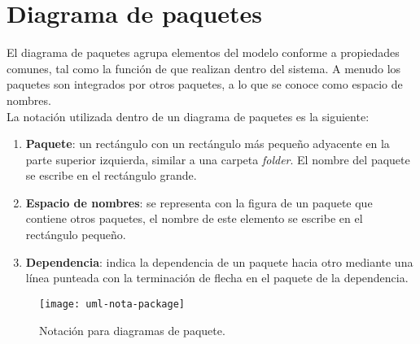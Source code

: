\section{Diagrama de paquetes}\label{sec:uml-package}
El diagrama de paquetes agrupa elementos del modelo conforme a propiedades comunes, tal como la función de que realizan dentro del sistema. A menudo los paquetes son integrados por otros paquetes, a lo que se conoce como espacio de nombres\cite{UMLClassroom}.\\
La notación utilizada dentro de un diagrama de paquetes es la siguiente\cite{UMLClassroom, SoftwareEngineeringUML}:
\begin{enumerate}
   \item \textbf{Paquete}: un rectángulo con un rectángulo más pequeño adyacente en la parte superior izquierda, similar a una carpeta \textit{folder}. El nombre del paquete se escribe en el rectángulo grande.
   \item \textbf{Espacio de nombres}: se representa con la figura de un paquete que contiene otros paquetes, el nombre de este elemento se escribe en el rectángulo pequeño.
   \item \textbf{Dependencia}: indica la dependencia de un paquete hacia otro mediante una línea punteada con la terminación de flecha en el paquete de la dependencia.
\end{enumerate} 
\begin{figure}[h]
  \centering
  \texttt{[image: uml-nota-package]}
  \caption{Notación para diagramas de paquete\cite{SoftwareEngineeringUML}.}
  \label{fig:uml-nota-package}
\end{figure}
